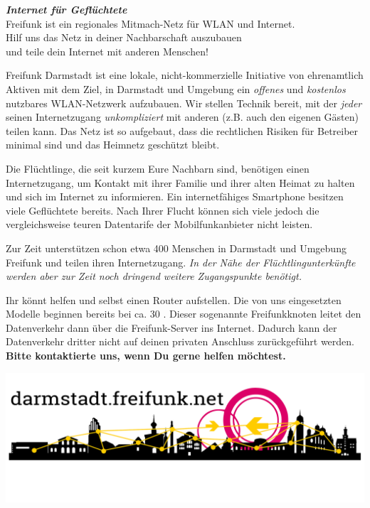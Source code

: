 \documentclass[a4paper]{article}
\begin{document}
\thispagestyle{empty}

\begin{center}
\Huge \textit{\textbf{\textcolor{freifunkpink}{Internet für Geflüchtete}}} \\
\vspace{0.6cm}
\large Freifunk ist ein regionales Mitmach-Netz für WLAN und Internet.\\
Hilf uns das Netz in deiner Nachbarschaft auszubauen \\
und teile dein Internet mit anderen Menschen!
\normalsize

\vspace{1.0cm}
\end{center}

{ }
\vspace{0.5cm}

Freifunk Darmstadt ist eine lokale, nicht-kommerzielle Initiative von ehrenamtlich Aktiven mit dem Ziel, in Darmstadt und Umgebung ein \emph{offenes} und \emph{kostenlos} nutzbares WLAN-Netzwerk aufzubauen. Wir stellen Technik bereit, mit der \emph{jeder} seinen Internetzugang \emph{unkompliziert} mit anderen (z.B. auch den eigenen Gästen) teilen kann. Das Netz ist so aufgebaut, dass die rechtlichen Risiken für Betreiber minimal sind und das Heimnetz geschützt bleibt.

Die Flüchtlinge, die seit kurzem Eure Nachbarn sind, benötigen einen Internetzugang, um Kontakt mit ihrer Familie und ihrer alten Heimat zu halten und sich im Internet zu informieren. Ein internetfähiges Smartphone besitzen viele Geflüchtete bereits. Nach Ihrer Flucht können sich viele jedoch die vergleichsweise teuren Datentarife der Mobilfunkanbieter nicht leisten.

Zur Zeit unterstützen schon etwa 400 Menschen in Darmstadt und Umgebung Freifunk und teilen ihren Internetzugang. \emph{In der Nähe der Flüchtlingunterkünfte werden aber zur Zeit noch dringend weitere Zugangspunkte benötigt.}

Ihr könnt helfen und selbst einen Router aufstellen. Die von uns eingesetzten Modelle beginnen bereits bei ca. 30 \texteuro. Dieser sogenannte Freifunkknoten leitet den Datenverkehr dann über die Freifunk-Server ins Internet. Dadurch kann der Datenverkehr dritter nicht auf deinen privaten Anschluss zurückgeführt werden. \textbf{Bitte kontaktierte uns, wenn Du gerne helfen möchtest.}

\vspace{1.28cm}
\hspace{-0.24cm}
\includegraphics[width=0.965\paperwidth]{../images/footer_dark}
\end{document}
